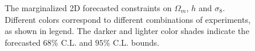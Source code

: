 \documentclass[prd,nofootinbib,showpacs]{revtex4}
\begin{document}
\begin{figure}[h!]
\begin{center}
\hspace{5mm}
\caption{The marginalized 2D forecasted constraints on $\Omega_m$, $h$ and $\sigma_8$. Different colors correspond to different combinations of experiments, as shown in legend. The darker and lighter color shades indicate the forecasted $68\%$ C.L. and $95\%$ C.L. bounds.}\label{fig:2Dfigure}
\end{center}
\end{figure}
\end{document}
